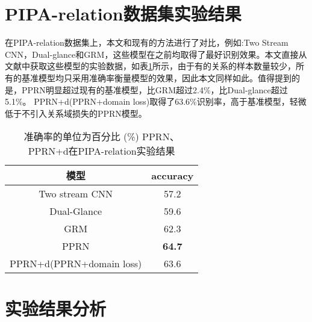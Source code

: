\section{PIPA-relation数据集实验结果}

在PIPA-relation数据集上，本文和现有的方法进行了对比，例如:Two Stream CNN\cite{sun2017a}，Dual-glance\cite{li2017dual-glance}和GRM\cite{wang2018deep}，这些模型在之前均取得了最好识别效果。本文直接从文献中获取这些模型的实验数据，如表\ref{tab:exp-pipa-table}所示，由于有的关系的样本数量较少，所有的基准模型均只采用准确率衡量模型的效果，因此本文同样如此。值得提到的是，PPRN明显超过现有的基准模型，比GRM超过2.4\%，比Dual-glance超过5.1\%。
PPRN+d(PPRN+domain loss)取得了63.6\%识别率，高于基准模型，轻微低于不引入关系域损失的PPRN模型。
\begin{table}[htpb]
  \centering
  \caption{准确率的单位为百分比 (\%) PPRN、PPRN+d在PIPA-relation实验结果}
   \vspace*{-3.5pt}
  \label{tab:exp-pipa-table}
  \begin{tabular}{c|c}
    \toprule
    模型 & accuracy \\
    \midrule
    Two stream CNN \cite{zhang2015beyond} & 57.2 \\
    \midrule
    Dual-Glance \cite{li2017dual-glance} & 59.6 \\
    \midrule
    GRM \cite{wang2018deep} & 62.3 \\
    \midrule
    PPRN & \textbf{64.7} \\
    \midrule
    PPRN+d(PPRN+domain loss)  & 63.6 \\
    \bottomrule
  \end{tabular}
\end{table}

\section{实验结果分析}

